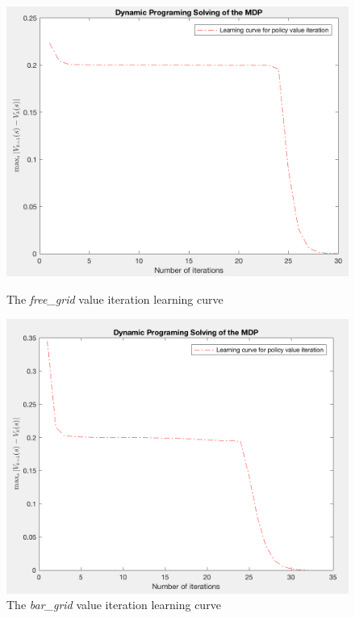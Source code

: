 \documentclass[a4paper]{report}
\begin{document}
{{{				\begin{figure}[ht!]
				\begin{minipage}{0.4\linewidth}
					\includegraphics[width=\linewidth]{free_grid_bellman_lc}
					\caption{The \emph{free\_grid} value iteration learning curve}
				\end{minipage}
				\hfill
				\begin{minipage}{0.4\linewidth}
					\includegraphics[width=\linewidth]{bar_grid_bellman_lc}
					\caption{The \emph{bar\_grid} value iteration learning curve}
				\end{minipage}
				\end{figure}
				
}}}
\end{document}
